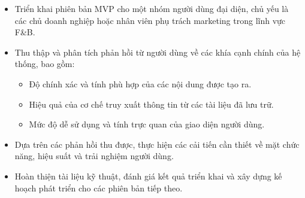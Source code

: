 \begin{itemize}
\item
  Triển khai phiên bản MVP cho một nhóm người dùng đại diện, chủ yếu là
  các chủ doanh nghiệp hoặc nhân viên phụ trách marketing trong lĩnh vực
  F\&B.
\item
  Thu thập và phân tích phản hồi từ người dùng về các khía cạnh chính
  của hệ thống, bao gồm:

  \begin{itemize}
  \item
    Độ chính xác và tính phù hợp của các nội dung được tạo ra.
  \item
    Hiệu quả của cơ chế truy xuất thông tin từ các tài liệu đã lưu trữ.
  \item
    Mức độ dễ sử dụng và tính trực quan của giao diện người dùng.
  \end{itemize}
\item
  Dựa trên các phản hồi thu được, thực hiện các cải tiến cần thiết về
  mặt chức năng, hiệu suất và trải nghiệm người dùng.
\item
  Hoàn thiện tài liệu kỹ thuật, đánh giá kết quả triển khai và xây dựng
  kế hoạch phát triển cho các phiên bản tiếp theo.
\end{itemize}
